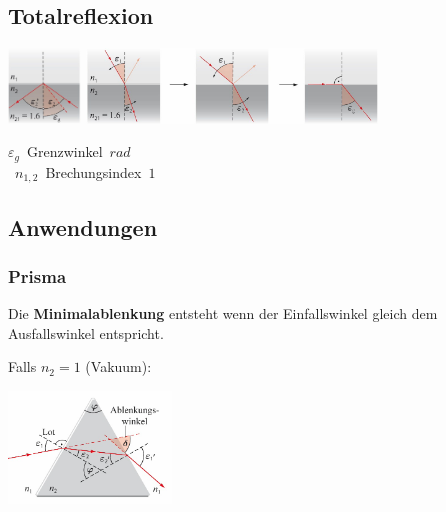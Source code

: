 \subsection{Totalreflexion}

\begin{center}
	\begin{minipage}{0.1\textwidth}
	\end{minipage}%
	\begin{minipage}{0.5\textwidth}
		\includegraphics[height=2cm,keepaspectratio=true]{Images/totalreflexion.png}
		\includegraphics[height=2cm,keepaspectratio=true]{Images/einfalswinkel.png}
	\end{minipage}
\end{center}

\unit{$\varepsilon_g$}{Grenzwinkel}{$rad$} \\
\unit{$n_{1,2}$}{Brechungsindex}{$1$}




\subsection{Anwendungen}
\subsubsection{Prisma}

Die \textbf{Minimalablenkung} entsteht wenn der Einfallswinkel gleich dem Ausfallswinkel entspricht.

\begin{center}
	\begin{minipage}{0.3\textwidth}
	
		Falls $ n_2 = 1 $ (Vakuum):
	\end{minipage}%
	\begin{minipage}{0.3\textwidth}
		\includegraphics[height=3cm,keepaspectratio=true]{Images/prisma.png}
	\end{minipage}
\end{center}

